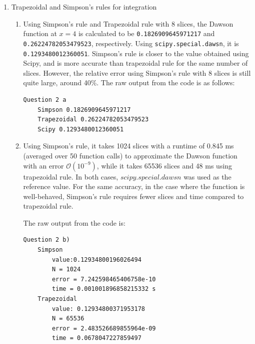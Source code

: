 \documentclass{article}
\newcommand{\code}{\texttt}
\begin{document}
\begin{enumerate}
\item Trapezoidal and Simpson’s rules for integration
\begin{enumerate}
    \item Using Simpson's rule and Trapezoidal rule with 8 slices, the Dawson function at $x=4$ is calculated to be \code{0.1826909645971217} and \code{0.26224782053479523}, respectively.
    Using \code{scipy.special.dawsn}, it is \code{0.1293480012360051}. Simpson's rule is closer to the value obtained using Scipy, and is more accurate than trapezoidal rule for the same number of slices. 
    However, the relative error using Simpson's rule with 8 slices is still quite large, around 40\%. The raw output from the code is as follows:

    \begin{verbatim}
Question 2 a
    Simpson 0.1826909645971217
    Trapezoidal 0.26224782053479523
    Scipy 0.1293480012360051
    \end{verbatim}


    \item 
    Using Simpson's rule, it takes 1024 slices with a runtime of 0.845 ms (averaged over 50 function calls) to approximate the Dawson function with an error $\mathcal{O}(10^{-9})$, while it takes 65536 slices and 48 ms using trapezoidal rule. In both cases, $scipy.special.dawsn$ was used as the reference value. 
    For the same accuracy, in the case where the function is well-behaved, Simpson's rule requires fewer slices and time compared to trapezoidal rule. 
    
    The raw output from the code is:

    \begin{verbatim} 
Question 2 b)
    Simpson
        value:0.12934800196026494
        N = 1024
        error = 7.242598465406758e-10
        time = 0.001001896858215332 s
    Trapezoidal
        value: 0.12934800371953178
        N = 65536
        error = 2.483526689855964e-09
        time = 0.0678047227859497
    \end{verbatim}
    

\end{enumerate}
\end{enumerate}
\end{document}
